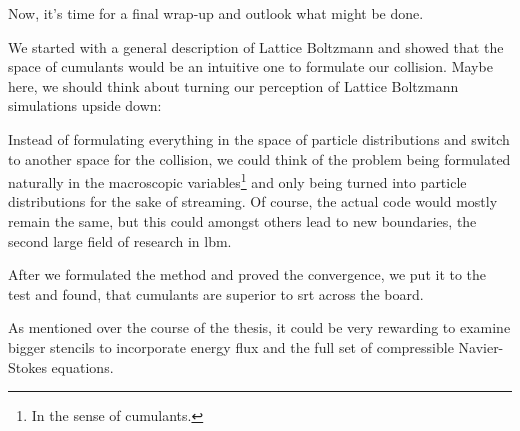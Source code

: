 
Now, it's time for a final wrap-up and outlook what might be done.

We started with a general description of Lattice Boltzmann and showed that the space of cumulants would be an intuitive one to formulate our collision.
Maybe here, we should think about turning our perception of Lattice Boltzmann simulations upside down:

Instead of formulating everything in the space of particle distributions and switch to another space for the collision, we could think of the problem being formulated naturally in the macroscopic variables\footnote{In the sense of cumulants.} and only being turned into particle distributions for the sake of streaming.
Of course, the actual code would mostly remain the same, but this could amongst others lead to new boundaries, the second large field of research in \gls{lbm}.

After we formulated the method and proved the convergence, we put it to the test and found, that cumulants are superior to \gls{srt} across the board.

As mentioned over the course of the thesis, it could be very rewarding to examine bigger stencils to incorporate energy flux and the full set of compressible Navier-Stokes equations.

